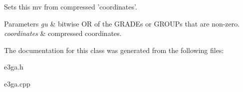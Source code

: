 Sets this mv from compressed 'coordinates'. 
\begin{DoxyParams}{Parameters}
{\em gu} & bitwise O\-R of the G\-R\-A\-D\-Es or G\-R\-O\-U\-Ps that are non-\/zero. \\
\hline
{\em coordinates} & compressed coordinates. \\
\hline
\end{DoxyParams}


The documentation for this class was generated from the following files\-:\begin{DoxyCompactItemize}
\item 
e3ga.\-h\item 
e3ga.\-cpp\end{DoxyCompactItemize}
